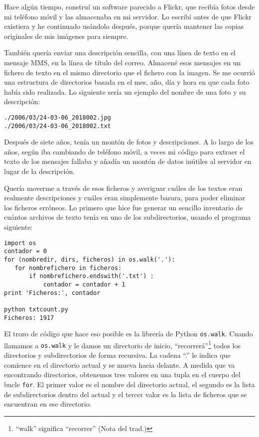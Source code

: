 Hace algún tiempo, construí un software parecido a Flickr, que
recibía fotos desde mi teléfono móvil y las almacenaba
en mi servidor. Lo escribí antes de que Flickr existiera y he continuado
usándolo después, porque quería mantener las copias originales
de mis imágenes para siempre.

También quería enviar una descripción sencilla, con una línea de texto en el mensaje MMS,
en la línea de título del correo. Almacené esos mensajes
en un fichero de texto en el mismo directorio que el fichero con la imagen.
Se me ocurrió una estructura de directorios basada en el mes, año, día y hora en
que cada foto había sido realizada. Lo siguiente sería un ejemplo del nombre
de una foto y su descripción:

\beforeverb
\begin{verbatim}
./2006/03/24-03-06_2018002.jpg
./2006/03/24-03-06_2018002.txt
\end{verbatim}
\afterverb
%
Después de siete años, tenía un montón de fotos y descripciones. A lo largo de los años,
según iba cambiando de teléfono móvil, a veces mi código para extraer el texto de los mensajes
fallaba y añadía un montón de datos inútiles al servidor en lugar de la descripción.

Quería moverme a través de esos ficheros y averiguar cuáles de los
textos eran realmente descripciones y cuáles eran simplemente basura, para poder eliminar
los ficheros erróneos. Lo primero que hice fue generar un sencillo inventario de
cuántos archivos de texto tenía en uno de los subdirectorios,
usando el programa siguiente:

\beforeverb
\begin{verbatim}
import os
contador = 0
for (nombredir, dirs, ficheros) in os.walk('.'):
   for nombrefichero in ficheros:
       if nombrefichero.endswith('.txt') :
           contador = contador + 1
print 'Ficheros:', contador

python txtcount.py
Ficheros: 1917
\end{verbatim}
\afterverb
%
El trozo de código que hace eso posible es la librería de Python
{\tt os.walk}. Cuando llamamos a {\tt os.walk} y le damos un directorio
de inicio, ``recorrerá''\footnote{``walk'' significa ``recorrer'' (Nota del trad.)}
todos los directorios y subdirectorios de forma recursiva. La cadena ``.'' le indica
que comience en el directorio actual y se mueva hacia delante.
A medida que va encontrando directorios, obtenemos tres valores en una tupla
en el cuerpo del bucle {\tt for}. El primer valor es el nombre del
directorio actual, el segundo es la lista de subdirectorios dentro
del actual y el tercer valor es la lista de ficheros
que se encuentran en ese directorio.

